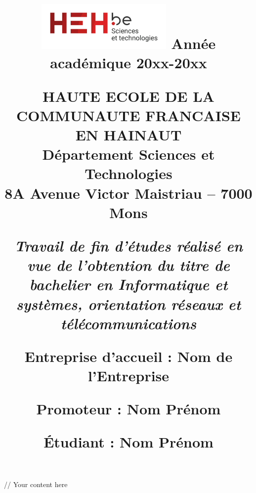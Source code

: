 \documentclass[a4paper, 12pt]{article}
\title{
    \vspace{-2.5cm}
    \begin{center}
        \includegraphics[width=0.5\textwidth]{img/logo_hehbe_tech.png}
        \hfill
        \normalsize{Année académique 20xx-20xx}
    \end{center}
    \vspace{2cm}
        
        {\large \textbf{HAUTE ECOLE DE LA COMMUNAUTE FRANCAISE EN HAINAUT}}\\
        {\large Département Sciences et Technologies}\\
        {\large 8A Avenue Victor Maistriau -- 7000 Mons}
    \vspace{2cm}
    \begin{center}
        \fboxrule=0.3mm
        \fbox{
            \parbox{\textwidth}{
                \vspace{1cm}
                \centering
                \textbf{Annexes}
                \vspace{1cm}
            }
        }
    \end{center}
    \vspace{1cm}
    \begin{center}
        \normalsize{\textit{Travail de fin d'études réalisé en vue de l'obtention du titre de bachelier en Informatique et systèmes, orientation réseaux et télécommunications}}
    \end{center}
    \vspace{6cm}
    \begin{center}
        \normalsize{Entreprise d'accueil : Nom de l'Entreprise}\\
    \end{center}
    \vspace{1cm}
    \begin{minipage}[t]{0.45\textwidth}
        \raggedright
        \normalsize Promoteur : Nom Prénom
    \end{minipage}
    \hfill
    \begin{minipage}[t]{0.45\textwidth}
        \raggedleft
        \normalsize Étudiant : Nom Prénom
    \end{minipage}
    \vfill
    \author{}
    \date{}

}
\begin{document}
\maketitle
\newpage
// Your content here
\end{document}
